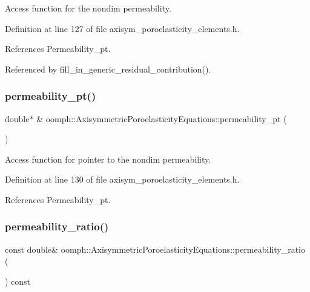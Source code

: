 Access function for the nondim permeability. 



Definition at line 127 of file axisym\+\_\+poroelasticity\+\_\+elements.\+h.



References Permeability\+\_\+pt.



Referenced by fill\+\_\+in\+\_\+generic\+\_\+residual\+\_\+contribution().

\mbox{\label{classoomph_1_1AxisymmetricPoroelasticityEquations_a4309befdee5285a1c04636b50401eca8}} 
\subsubsection{\texorpdfstring{permeability\+\_\+pt()}{permeability\_pt()}}
{\footnotesize\ttfamily double$\ast$ \& oomph\+::\+Axisymmetric\+Poroelasticity\+Equations\+::permeability\+\_\+pt (\begin{DoxyParamCaption}{ }\end{DoxyParamCaption})\hspace{0.3cm}{\ttfamily [inline]}}



Access function for pointer to the nondim permeability. 



Definition at line 130 of file axisym\+\_\+poroelasticity\+\_\+elements.\+h.



References Permeability\+\_\+pt.

\mbox{\label{classoomph_1_1AxisymmetricPoroelasticityEquations_a4c777d0a0a82afa9342cca27609b0049}} 
\subsubsection{\texorpdfstring{permeability\+\_\+ratio()}{permeability\_ratio()}}
{\footnotesize\ttfamily const double\& oomph\+::\+Axisymmetric\+Poroelasticity\+Equations\+::permeability\+\_\+ratio (\begin{DoxyParamCaption}{ }\end{DoxyParamCaption}) const\hspace{0.3cm}{\ttfamily [inline]}}



